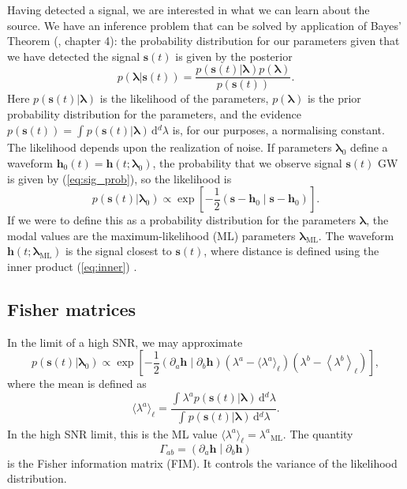 \documentclass[useAMS,usedcolumn,usegraphicx,usenatbib]{mn2e}
\newcommand{\eqnref}[1]{(\ref{eq:#1})}
\newcommand{\sub}[1]{\ensuremath{_\mathrm{#1}}}
\newcommand{\dd}{\ensuremath{\mathrm{d}}}
\newcommand{\intd}[4]{\ensuremath{\int_{#1}^{#2}{#3}\,\dd{#4}}}
\newcommand{\recip}[1]{\ensuremath{\frac{1}{#1}}}
\newcommand{\innerprod}[2]{\ensuremath{\left({#1}\middle|{#2}\right)}}
\begin{document}
Having detected a signal, we are interested in what we can learn about the source. We have an inference problem that can be solved by  application of Bayes' Theorem (\citealt{Jaynes2003}, chapter 4): the probability distribution for our parameters given that we have detected the signal $\boldsymbol{s}(t)$ is given by the posterior
\begin{equation}
p(\boldsymbol{\lambda}|\boldsymbol{s}(t)) = \frac{p(\boldsymbol{s}(t)|\boldsymbol{\lambda})p(\boldsymbol{\lambda})}{p(\boldsymbol{s}(t))}.
\end{equation}
Here $p(\boldsymbol{s}(t)|\boldsymbol{\lambda})$ is the likelihood of the parameters, $p(\boldsymbol{\lambda})$ is the prior probability distribution for the parameters, and the evidence $p(\boldsymbol{s}(t)) = \intd{}{}{p(\boldsymbol{s}(t)|\boldsymbol{\lambda})}{^d \lambda}$ is, for our purposes, a normalising constant. The likelihood depends upon the realization of noise. If parameters $\boldsymbol{\lambda}_0$ define a waveform $\boldsymbol{h}_0(t) = \boldsymbol{h}(t; \boldsymbol{\lambda}_0)$, the probability that we observe signal $\boldsymbol{s}(t)$ GW is given by \eqnref{sig_prob}, so the likelihood is
\begin{equation}
p(\boldsymbol{s}(t)|\boldsymbol{\lambda}_0) \propto \exp\left[-\recip{2}\innerprod{\boldsymbol{s}-\boldsymbol{h}_0}{\boldsymbol{s}-\boldsymbol{h}_0}\right].
\label{eq:likelihood}
\end{equation}
If we were to define this as a probability distribution for the parameters $\boldsymbol{\lambda}$, the modal values are the maximum-likelihood (ML) parameters $\boldsymbol{\lambda}\sub{ML}$. The waveform $\boldsymbol{h}(t; \boldsymbol{\lambda}\sub{ML})$ is the signal closest to $\boldsymbol{s}(t)$, where distance is defined using the inner product \eqnref{inner} \citep{Cutler1994}.

\subsection{Fisher matrices}

In the limit of a high SNR, we may approximate \citep{Vallisneri2008}
\begin{equation}
p(\boldsymbol{s}(t)|\boldsymbol{\lambda}_0) \propto \exp\left[-\recip{2}\innerprod{\partial_a\boldsymbol{h}}{\partial_b\boldsymbol{h}}\left(\lambda^a - \langle\lambda^a\rangle_\ell\right)\left(\lambda^b - \left\langle\lambda^b\right\rangle_\ell\right)\right],
\label{eq:LSA}
\end{equation}
where the mean is defined as
\begin{equation}
\langle\lambda^a\rangle_\ell = \frac{\intd{}{}{\lambda^a p(\boldsymbol{s}(t)|\boldsymbol{\lambda})}{^d \lambda}}{\intd{}{}{p(\boldsymbol{s}(t)|\boldsymbol{\lambda})}{^d \lambda}}.
\end{equation}
In the high SNR limit, this is the ML value $\langle\lambda^a\rangle_\ell = \lambda^a\sub{ML}$. The quantity
\begin{equation}
\Gamma_{ab} = \innerprod{\partial_a\boldsymbol{h}}{\partial_b\boldsymbol{h}}
\label{eq:Fisher}
\end{equation}
is the Fisher information matrix (FIM). It controls the variance of the likelihood distribution.
\end{document}
